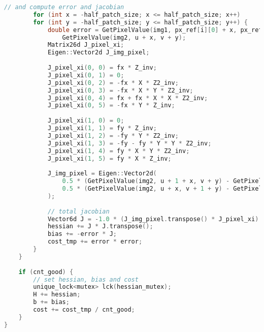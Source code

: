\begin{lstlisting}[language=c++,caption=slambook2/ch8/direct_method.cpp (part)]
		// and compute error and jacobian
		for (int x = -half_patch_size; x <= half_patch_size; x++)
		for (int y = -half_patch_size; y <= half_patch_size; y++) {
			double error = GetPixelValue(img1, px_ref[i][0] + x, px_ref[i][1] + y) -
				GetPixelValue(img2, u + x, v + y);
			Matrix26d J_pixel_xi;
			Eigen::Vector2d J_img_pixel;
			
			J_pixel_xi(0, 0) = fx * Z_inv;
			J_pixel_xi(0, 1) = 0;
			J_pixel_xi(0, 2) = -fx * X * Z2_inv;
			J_pixel_xi(0, 3) = -fx * X * Y * Z2_inv;
			J_pixel_xi(0, 4) = fx + fx * X * X * Z2_inv;
			J_pixel_xi(0, 5) = -fx * Y * Z_inv;
			
			J_pixel_xi(1, 0) = 0;
			J_pixel_xi(1, 1) = fy * Z_inv;
			J_pixel_xi(1, 2) = -fy * Y * Z2_inv;
			J_pixel_xi(1, 3) = -fy - fy * Y * Y * Z2_inv;
			J_pixel_xi(1, 4) = fy * X * Y * Z2_inv;
			J_pixel_xi(1, 5) = fy * X * Z_inv;
			
			J_img_pixel = Eigen::Vector2d(
				0.5 * (GetPixelValue(img2, u + 1 + x, v + y) - GetPixelValue(img2, u - 1 + x, v + y)),
				0.5 * (GetPixelValue(img2, u + x, v + 1 + y) - GetPixelValue(img2, u + x, v - 1 + y))
			);
			
			// total jacobian
			Vector6d J = -1.0 * (J_img_pixel.transpose() * J_pixel_xi).transpose();
			hessian += J * J.transpose();
			bias += -error * J;
			cost_tmp += error * error;
		}
	}
	
	if (cnt_good) {
		// set hessian, bias and cost
		unique_lock<mutex> lck(hessian_mutex);
		H += hessian;
		b += bias;
		cost += cost_tmp / cnt_good;
	}
}
\end{lstlisting}

